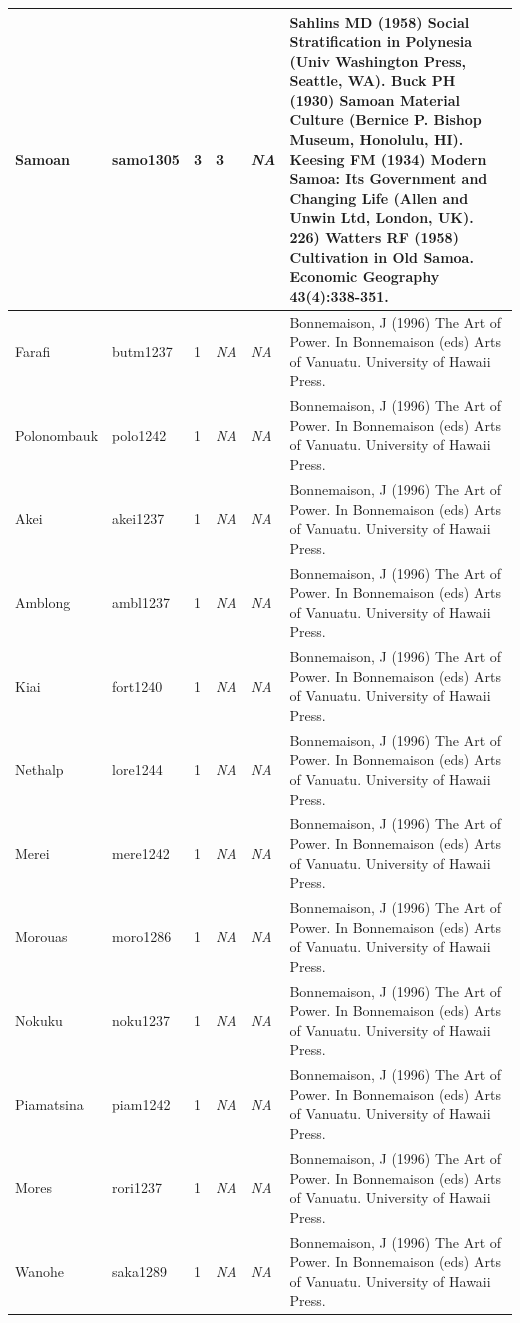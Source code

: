 \documentclass[draft,10pt]{article} %
\begin{document}
\begin{landscape}
\begin{longtable}{ | p{2cm}| p{2cm}| p{1.8cm}| p{1.8cm}| p{3cm}| p{9cm}| }
Samoan&samo1305&3&3&\emph{NA}&Sahlins MD (1958) Social Stratification in Polynesia (Univ Washington Press, Seattle, WA). Buck PH (1930) Samoan Material Culture (Bernice P. Bishop Museum, Honolulu, HI). Keesing FM (1934) Modern Samoa: Its Government and Changing Life (Allen and Unwin Ltd, London, UK). 226) Watters RF (1958) Cultivation in Old Samoa. Economic Geography 43(4):338-351. \\ \hline
Farafi&butm1237&1&\emph{NA}&\emph{NA}&Bonnemaison, J (1996) The Art of Power. In Bonnemaison (eds) Arts of Vanuatu. University of Hawaii Press.\\ \hline
Polonombauk&polo1242&1&\emph{NA}&\emph{NA}&Bonnemaison, J (1996) The Art of Power. In Bonnemaison (eds) Arts of Vanuatu. University of Hawaii Press.\\ \hline
Akei&akei1237&1&\emph{NA}&\emph{NA}&Bonnemaison, J (1996) The Art of Power. In Bonnemaison (eds) Arts of Vanuatu. University of Hawaii Press.\\ \hline
Amblong&ambl1237&1&\emph{NA}&\emph{NA}&Bonnemaison, J (1996) The Art of Power. In Bonnemaison (eds) Arts of Vanuatu. University of Hawaii Press.\\ \hline
Kiai&fort1240&1&\emph{NA}&\emph{NA}&Bonnemaison, J (1996) The Art of Power. In Bonnemaison (eds) Arts of Vanuatu. University of Hawaii Press.\\ \hline
Nethalp&lore1244&1&\emph{NA}&\emph{NA}&Bonnemaison, J (1996) The Art of Power. In Bonnemaison (eds) Arts of Vanuatu. University of Hawaii Press.\\ \hline
Merei&mere1242&1&\emph{NA}&\emph{NA}&Bonnemaison, J (1996) The Art of Power. In Bonnemaison (eds) Arts of Vanuatu. University of Hawaii Press.\\ \hline
Morouas&moro1286&1&\emph{NA}&\emph{NA}&Bonnemaison, J (1996) The Art of Power. In Bonnemaison (eds) Arts of Vanuatu. University of Hawaii Press.\\ \hline
Nokuku&noku1237&1&\emph{NA}&\emph{NA}&Bonnemaison, J (1996) The Art of Power. In Bonnemaison (eds) Arts of Vanuatu. University of Hawaii Press.\\ \hline
Piamatsina&piam1242&1&\emph{NA}&\emph{NA}&Bonnemaison, J (1996) The Art of Power. In Bonnemaison (eds) Arts of Vanuatu. University of Hawaii Press.\\ \hline
Mores&rori1237&1&\emph{NA}&\emph{NA}&Bonnemaison, J (1996) The Art of Power. In Bonnemaison (eds) Arts of Vanuatu. University of Hawaii Press.\\ \hline
Wanohe&saka1289&1&\emph{NA}&\emph{NA}&Bonnemaison, J (1996) The Art of Power. In Bonnemaison (eds) Arts of Vanuatu. University of Hawaii Press.\\ \hline

\end{longtable}
\end{landscape}
\end{document}
